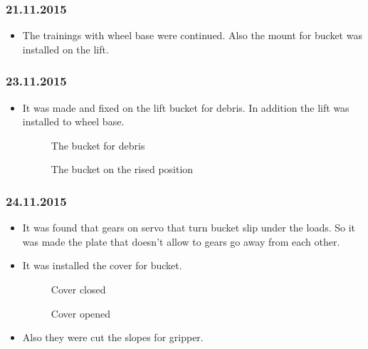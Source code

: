 \subsubsection{21.11.2015}
\begin{itemize}
\item The trainings with wheel base were continued. Also the mount for bucket was installed on the lift.
\end{itemize}
\subsubsection{23.11.2015}
\begin{itemize}
\item It was made and fixed on the lift bucket for debris. In addition the lift was installed to wheel base. 
\begin{figure}[H]
	\begin{minipage}[h]{1\linewidth}
		\caption{The bucket for debris}
	\end{minipage}
\end{figure} 
\begin{figure}[H]
	\begin{minipage}[h]{1\linewidth}
		\caption{The bucket on the rised position}
	\end{minipage}
\end{figure} 
\end{itemize}
\subsubsection{24.11.2015}
\begin{itemize}
\item It was found that gears on servo that turn bucket slip under the loads. So it was made the plate that doesn't allow to gears go away from each other. 
\item It was installed the cover for bucket.
\begin{figure}[H]
	\begin{minipage}[h]{1\linewidth}
		\caption{Cover closed}
	\end{minipage}
\end{figure} 
\begin{figure}[H]
	\begin{minipage}[h]{1\linewidth}
		\caption{Cover opened}
	\end{minipage}
\end{figure} 
\item Also they were cut the slopes for gripper.
\end{itemize}
